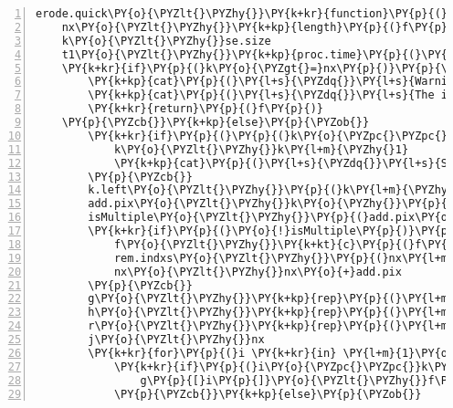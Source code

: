 \begin{Verbatim}[commandchars=\\\{\},codes={\catcode`\$=3\catcode`\^=7\catcode`\_=8},gobble=0,numbers=left,fontfamily=fvm,fontshape=n,fontsize=\footnotesize,tabsize=2]
erode.quick\PY{o}{\PYZlt{}\PYZhy{}}\PY{k+kr}{function}\PY{p}{(}f\PY{p}{,}se.size\PY{p}{)}\PY{p}{\PYZob{}}
	nx\PY{o}{\PYZlt{}\PYZhy{}}\PY{k+kp}{length}\PY{p}{(}f\PY{p}{)}
	k\PY{o}{\PYZlt{}\PYZhy{}}se.size
	t1\PY{o}{\PYZlt{}\PYZhy{}}\PY{k+kp}{proc.time}\PY{p}{(}\PY{p}{)}\PY{p}{[}\PY{l+m}{3}\PY{p}{]} \PY{c+c1}{\PYZsh{}\PYZsh{}\PYZsh{} get start time}
	\PY{k+kr}{if}\PY{p}{(}k\PY{o}{\PYZgt{}=}nx\PY{p}{)}\PY{p}{\PYZob{}}
		\PY{k+kp}{cat}\PY{p}{(}\PY{l+s}{\PYZdq{}}\PY{l+s}{Warning: structuring element is \PYZgt{}= in length as the input\PYZbs{}n\PYZdq{}}\PY{p}{)}
		\PY{k+kp}{cat}\PY{p}{(}\PY{l+s}{\PYZdq{}}\PY{l+s}{The input vector has been output \PYZbs{}n\PYZdq{}}\PY{p}{)}
		\PY{k+kr}{return}\PY{p}{(}f\PY{p}{)}
	\PY{p}{\PYZcb{}}\PY{k+kp}{else}\PY{p}{\PYZob{}}
		\PY{k+kr}{if}\PY{p}{(}\PY{p}{(}k\PY{o}{\PYZpc{}\PYZpc{}}\PY{l+m}{2}\PY{p}{)} \PY{o}{!=} \PY{l+m}{1}\PY{p}{)}\PY{p}{\PYZob{}}
			k\PY{o}{\PYZlt{}\PYZhy{}}k\PY{l+m}{\PYZhy{}1}
			\PY{k+kp}{cat}\PY{p}{(}\PY{l+s}{\PYZdq{}}\PY{l+s}{Structring Element not symmetric, using SE length \PYZhy{}1 =\PYZdq{}}\PY{p}{,}k\PY{p}{,}\PY{l+s}{\PYZdq{}}\PY{l+s}{\PYZbs{}n\PYZdq{}}\PY{p}{)}
		\PY{p}{\PYZcb{}}
		k.left\PY{o}{\PYZlt{}\PYZhy{}}\PY{p}{(}k\PY{l+m}{\PYZhy{}1}\PY{p}{)}\PY{o}{/}\PY{l+m}{2}
		add.pix\PY{o}{\PYZlt{}\PYZhy{}}k\PY{o}{\PYZhy{}}\PY{p}{(}nx\PY{o}{\PYZpc{}\PYZpc{}}k\PY{p}{)}
		isMultiple\PY{o}{\PYZlt{}\PYZhy{}}\PY{p}{(}add.pix\PY{o}{==}k\PY{p}{)}
		\PY{k+kr}{if}\PY{p}{(}\PY{o}{!}isMultiple\PY{p}{)}\PY{p}{\PYZob{}}
			f\PY{o}{\PYZlt{}\PYZhy{}}\PY{k+kt}{c}\PY{p}{(}f\PY{p}{,}\PY{k+kp}{rep}\PY{p}{(}\PY{o}{+}\PY{k+kc}{Inf}\PY{p}{,}add.pix\PY{p}{)}\PY{p}{)}
			rem.indxs\PY{o}{\PYZlt{}\PYZhy{}}\PY{p}{(}nx\PY{l+m}{+1}\PY{p}{)}\PY{o}{:}\PY{p}{(}nx\PY{o}{+}add.pix\PY{p}{)}
			nx\PY{o}{\PYZlt{}\PYZhy{}}nx\PY{o}{+}add.pix
		\PY{p}{\PYZcb{}}
		g\PY{o}{\PYZlt{}\PYZhy{}}\PY{k+kp}{rep}\PY{p}{(}\PY{l+m}{0}\PY{p}{,}nx\PY{p}{)}
		h\PY{o}{\PYZlt{}\PYZhy{}}\PY{k+kp}{rep}\PY{p}{(}\PY{l+m}{0}\PY{p}{,}nx\PY{p}{)}
		r\PY{o}{\PYZlt{}\PYZhy{}}\PY{k+kp}{rep}\PY{p}{(}\PY{l+m}{0}\PY{p}{,}nx\PY{p}{)}
		j\PY{o}{\PYZlt{}\PYZhy{}}nx
		\PY{k+kr}{for}\PY{p}{(}i \PY{k+kr}{in} \PY{l+m}{1}\PY{o}{:}nx\PY{p}{)}\PY{p}{\PYZob{}}
			\PY{k+kr}{if}\PY{p}{(}i\PY{o}{\PYZpc{}\PYZpc{}}k\PY{o}{==}\PY{l+m}{1}\PY{p}{)}\PY{p}{\PYZob{}}
				g\PY{p}{[}i\PY{p}{]}\PY{o}{\PYZlt{}\PYZhy{}}f\PY{p}{[}i\PY{p}{]}
			\PY{p}{\PYZcb{}}\PY{k+kp}{else}\PY{p}{\PYZob{}}

\end{Verbatim}
